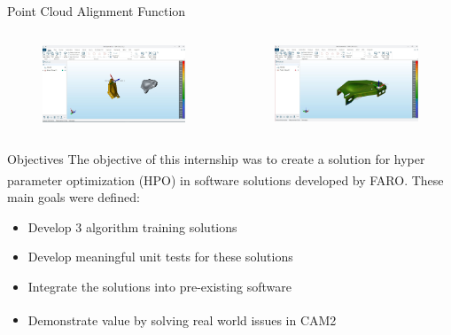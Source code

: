 \documentclass[10pt]{beamer}
\newcommand{\farons}[0]{FARO\textsuperscript{\textregistered}}
\begin{document}
  \begin{frame}{Point Cloud Alignment Function}
    \begin{columns}
      \begin{column}{0.55\textwidth}
        \begin{figure}
        \centering
        \includegraphics[width=\textwidth]{images/unaligned.png}
        \end{figure}
      \end{column}
      \begin{column}{0.55\textwidth}
        \begin{figure}
        \centering
        \includegraphics[width=\textwidth]{images/aligned.png}
        \end{figure}
      \end{column}
    \end{columns}
  \end{frame}
  \begin{frame}{Objectives}
    The objective of this internship was to create a solution for hyper parameter optimization (HPO) in software solutions developed by \farons. These main goals were defined:
    \begin{itemize}
      \item Develop 3 algorithm training solutions
      \item Develop meaningful unit tests for these solutions
      \item Integrate the solutions into pre-existing software
      \item Demonstrate value by solving real world issues in CAM2\textsuperscript{\textregistered}
    \end{itemize}
  \end{frame}
\end{document}
